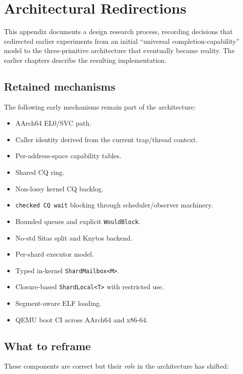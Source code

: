 \chapter{Architectural Redirections}

This appendix documents a design research process, recording decisions that 
redirected earlier experiments from an initial ``universal completion-capability'' 
model to the three-primitive architecture that eventually became reality. 
The earlier chapters describe the resulting implementation.

\section{Retained mechanisms}

The following early mechanisms remain part of the architecture:

\begin{itemize}
    \item AArch64 EL0/SVC path.
    \item Caller identity derived from the current trap/thread context.
    \item Per-address-space capability tables.
    \item Shared CQ ring.
    \item Non-lossy kernel CQ backlog.
    \item \texttt{checked CQ wait} blocking through scheduler/observer machinery.
    \item Bounded queues and explicit \texttt{WouldBlock}.
    \item No-std Sitas split and Knytos backend.
    \item Per-shard executor model.
    \item Typed in-kernel \texttt{ShardMailbox<M>}.
    \item Closure-based \texttt{ShardLocal<T>} with restricted use.
    \item Segment-aware ELF loading.
    \item QEMU boot CI across AArch64 and x86-64.
\end{itemize}

\section{What to reframe}

These components are correct but their \emph{role} in the architecture has
shifted:

